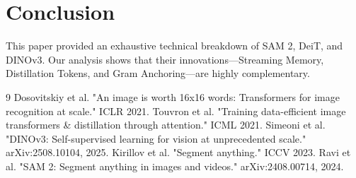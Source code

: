 \documentclass[twocolumn,10pt,a4paper]{article}
\begin{document}
\section{Conclusion}
This paper provided an exhaustive technical breakdown of SAM 2, DeiT, and DINOv3. Our analysis shows that their innovations—Streaming Memory, Distillation Tokens, and Gram Anchoring—are highly complementary.

\begin{thebibliography}{9}
 Dosovitskiy et al. "An image is worth 16x16 words: Transformers for image recognition at scale." ICLR 2021.
 Touvron et al. "Training data-efficient image transformers \& distillation through attention." ICML 2021.
 Simeoni et al. "DINOv3: Self-supervised learning for vision at unprecedented scale." arXiv:2508.10104, 2025.
 Kirillov et al. "Segment anything." ICCV 2023.
 Ravi et al. "SAM 2: Segment anything in images and videos." arXiv:2408.00714, 2024.
\end{thebibliography}
\end{document}
